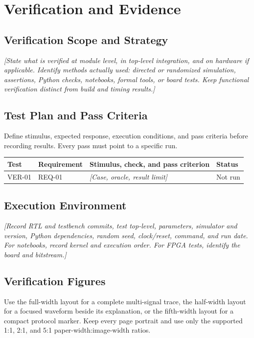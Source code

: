 \chapter{Verification and Evidence}

\section{Verification Scope and Strategy}
\textit{[State what is verified at module level, in top-level integration, and on hardware if applicable. Identify methods actually used: directed or randomized simulation, assertions, Python checks, notebooks, formal tools, or board tests. Keep functional verification distinct from build and timing results.]}

\section{Test Plan and Pass Criteria}
Define stimulus, expected response, execution conditions, and pass criteria before recording results. Every pass must point to a specific run.

\begin{tabularx}{\textwidth}{@{}p{16mm}p{24mm}X p{26mm}@{}}
  \toprule
  Test & Requirement & Stimulus, check, and pass criterion & Status \\
  \midrule
  VER-01 & REQ-01 & \textit{[Case, oracle, result limit]} & Not run \\
  \bottomrule
\end{tabularx}

\section{Execution Environment}
\textit{[Record RTL and testbench commits, test top-level, parameters, simulator and version, Python dependencies, random seed, clock/reset, command, and run date. For notebooks, record kernel and execution order. For FPGA tests, identify the board and bitstream.]}

\section{Verification Figures}
Use the full-width layout for a complete multi-signal trace, the half-width layout for a focused waveform beside its explanation, or the fifth-width layout for a compact protocol marker. Keep every page portrait and use only the supported 1:1, 2:1, and 5:1 paper-width:image-width ratios.

